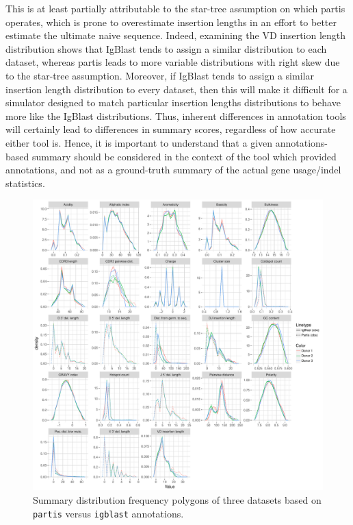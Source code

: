 \documentclass{article}
\begin{document}
This is at least partially attributable to the star-tree assumption on which partis operates, which is prone to overestimate insertion lengths in an effort to better estimate the ultimate naive sequence.
Indeed, examining the VD insertion length distribution shows that IgBlast tends to assign a similar distribution to each dataset, whereas partis leads to more variable distributions with right skew due to the star-tree assumption.
Moreover, if IgBlast tends to assign a similar insertion length distribution to every dataset, then this will make it difficult for a simulator designed to match particular insertion lengths distributions to behave more like the IgBlast distributions.
Thus, inherent differences in annotation tools will certainly lead to differences in summary scores, regardless of how accurate either tool is.
Hence, it is important to understand that a given annotations-based summary should be considered in the context of the tool which provided annotations, and not as a ground-truth summary of the actual gene usage/indel statistics.



\begin{figure}
    \includegraphics[width=\linewidth]{Figures/PartisScores/pi_freqpoly.pdf}
    \caption{Summary distribution frequency polygons of three datasets based on \texttt{partis} versus \texttt{igblast} annotations.}
\end{figure}
\end{document}
